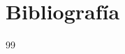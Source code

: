 \newpage
\section*{Bibliografía}

\begin{thebibliography}{99}
	
	\bibitem{}
	
	
\end{thebibliography}
